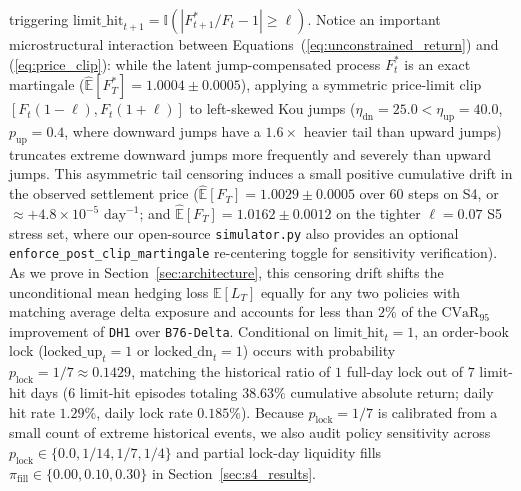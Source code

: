 \documentclass[11pt,a4paper]{article}
\begin{document}
triggering $\text{limit\_hit}_{t+1} = \mathbb{I}(|F_{t+1}^* / F_t - 1| \ge \ell)$. Notice an important microstructural interaction between Equations~(\ref{eq:unconstrained_return}) and (\ref{eq:price_clip}): while the latent jump-compensated process $F_t^*$ is an exact martingale ($\widehat{\mathbb{E}}[F_T^*] = 1.0004 \pm 0.0005$), applying a symmetric price-limit clip $[F_t(1-\ell), F_t(1+\ell)]$ to left-skewed Kou jumps ($\eta_{\text{dn}} = 25.0 < \eta_{\text{up}} = 40.0$, $p_{\text{up}} = 0.4$, where downward jumps have a $1.6\times$ heavier tail than upward jumps) truncates extreme downward jumps more frequently and severely than upward jumps. This asymmetric tail censoring induces a small positive cumulative drift in the observed settlement price ($\widehat{\mathbb{E}}[F_T] = 1.0029 \pm 0.0005$ over 60 steps on S4, or $\approx +4.8 \times 10^{-5}\text{ day}^{-1}$; and $\widehat{\mathbb{E}}[F_T] = 1.0162 \pm 0.0012$ on the tighter $\ell = 0.07$ S5 stress set, where our open-source \texttt{simulator.py} also provides an optional \texttt{enforce\_post\_clip\_martingale} re-centering toggle for sensitivity verification). As we prove in Section~\ref{sec:architecture}, this censoring drift shifts the unconditional mean hedging loss $\mathbb{E}[L_T]$ equally for any two policies with matching average delta exposure and accounts for less than $2\%$ of the $\text{CVaR}_{95}$ improvement of \texttt{DH1} over \texttt{B76-Delta}. Conditional on $\text{limit\_hit}_{t} = 1$, an order-book lock ($\text{locked\_up}_t = 1$ or $\text{locked\_dn}_t = 1$) occurs with probability $p_{\text{lock}} = 1/7 \approx 0.1429$, matching the historical ratio of $1$ full-day lock out of $7$ limit-hit days ($6$ limit-hit episodes totaling $38.63\%$ cumulative absolute return; daily hit rate $1.29\%$, daily lock rate $0.185\%$). Because $p_{\text{lock}} = 1/7$ is calibrated from a small count of extreme historical events, we also audit policy sensitivity across $p_{\text{lock}} \in \{0.0, 1/14, 1/7, 1/4\}$ and partial lock-day liquidity fills $\pi_{\text{fill}} \in \{0.00, 0.10, 0.30\}$ in Section~\ref{sec:s4_results}.
\end{document}
